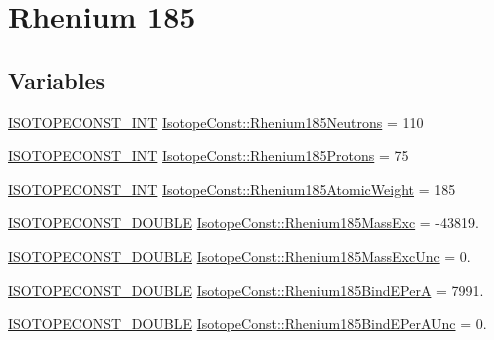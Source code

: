 \hypertarget{group___isotope_const-_rhenium-_re185}{}\section{Rhenium 185}
\label{group___isotope_const-_rhenium-_re185}
\subsection*{Variables}
\begin{DoxyCompactItemize}
\item 
\mbox{\hyperlink{group___isotope_const-_macros_ga5f18360b3e99483a35c32d789e62621c}{I\+S\+O\+T\+O\+P\+E\+C\+O\+N\+S\+T\+\_\+\+I\+NT}} \mbox{\hyperlink{group___isotope_const-_rhenium-_re185_gae2d7fd09588fd30f61a3a300255e1851}{Isotope\+Const\+::\+Rhenium185\+Neutrons}} = 110
\item 
\mbox{\hyperlink{group___isotope_const-_macros_ga5f18360b3e99483a35c32d789e62621c}{I\+S\+O\+T\+O\+P\+E\+C\+O\+N\+S\+T\+\_\+\+I\+NT}} \mbox{\hyperlink{group___isotope_const-_rhenium-_re185_gab9bce09723d5400d84fdc38d6f624f4a}{Isotope\+Const\+::\+Rhenium185\+Protons}} = 75
\item 
\mbox{\hyperlink{group___isotope_const-_macros_ga5f18360b3e99483a35c32d789e62621c}{I\+S\+O\+T\+O\+P\+E\+C\+O\+N\+S\+T\+\_\+\+I\+NT}} \mbox{\hyperlink{group___isotope_const-_rhenium-_re185_gafed7cccea3efc599693f39596dce89bb}{Isotope\+Const\+::\+Rhenium185\+Atomic\+Weight}} = 185
\item 
\mbox{\hyperlink{group___isotope_const-_macros_ga8f45a7272ce02c0b4c65c44636ed719a}{I\+S\+O\+T\+O\+P\+E\+C\+O\+N\+S\+T\+\_\+\+D\+O\+U\+B\+LE}} \mbox{\hyperlink{group___isotope_const-_rhenium-_re185_gaad7c581fd93545c4f9b63da0a7641889}{Isotope\+Const\+::\+Rhenium185\+Mass\+Exc}} = -\/43819.
\item 
\mbox{\hyperlink{group___isotope_const-_macros_ga8f45a7272ce02c0b4c65c44636ed719a}{I\+S\+O\+T\+O\+P\+E\+C\+O\+N\+S\+T\+\_\+\+D\+O\+U\+B\+LE}} \mbox{\hyperlink{group___isotope_const-_rhenium-_re185_ga8fcedb5562dcfe7b55443e3632344c58}{Isotope\+Const\+::\+Rhenium185\+Mass\+Exc\+Unc}} = 0.
\item 
\mbox{\hyperlink{group___isotope_const-_macros_ga8f45a7272ce02c0b4c65c44636ed719a}{I\+S\+O\+T\+O\+P\+E\+C\+O\+N\+S\+T\+\_\+\+D\+O\+U\+B\+LE}} \mbox{\hyperlink{group___isotope_const-_rhenium-_re185_ga6d70d30b926e43e721f7f6263ba4c7be}{Isotope\+Const\+::\+Rhenium185\+Bind\+E\+PerA}} = 7991.
\item 
\mbox{\hyperlink{group___isotope_const-_macros_ga8f45a7272ce02c0b4c65c44636ed719a}{I\+S\+O\+T\+O\+P\+E\+C\+O\+N\+S\+T\+\_\+\+D\+O\+U\+B\+LE}} \mbox{\hyperlink{group___isotope_const-_rhenium-_re185_ga3730da2941d9d2c1f50a68c59484d3eb}{Isotope\+Const\+::\+Rhenium185\+Bind\+E\+Per\+A\+Unc}} = 0.

\end{DoxyCompactItemize}
